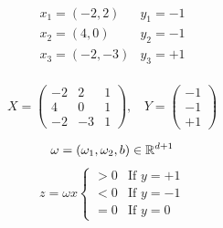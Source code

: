 \documentclass[12pt]{article}
\newenvironment{solution}[2][Solution]{\begin{trivlist}
\item[\hskip \labelsep {\bfseries #1}]}{\end{trivlist}}
\begin{document}
\begin{solution}{}~
$$\begin{array}{ll} 
x_1=(-2,2) & y_1=-1\\
x_2=(4,0) & y_2=-1\\
x_3=(-2,-3) & y_3=+1
\end{array}$$
~\\
$$X=\left(\begin{array}{ccc}
         -2 & 2 & 1\\
         4 & 0 & 1\\
         -2 & -3 & 1
         \end{array}\right),\ \ \ \ 
Y=\left(\begin{array}{c}
         -1\\
         -1\\
         +1
         \end{array}\right)$$

$$\omega=(\omega_1,\omega_2,b)\in\mathbb R^{d+1}\\$$
$$
z=\omega x \left\{\begin{array}{ll}>0 & \text{If }y=+1\\<0 &\text{If }y=-1\\=0 &\text{If }y=0\end{array}\right.
$$


\end{solution}
\end{document}
